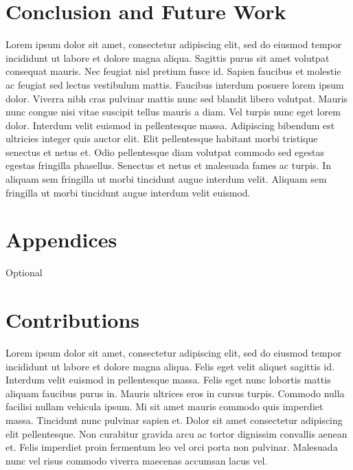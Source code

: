 \documentclass[conference]{IEEEtran}
\begin{document}
\section{Conclusion and Future Work}
Lorem ipsum dolor sit amet, consectetur adipiscing elit, sed do eiusmod tempor incididunt ut labore et dolore magna aliqua. Sagittis purus sit amet volutpat consequat mauris. Nec feugiat nisl pretium fusce id. Sapien faucibus et molestie ac feugiat sed lectus vestibulum mattis. Faucibus interdum posuere lorem ipsum dolor. Viverra nibh cras pulvinar mattis nunc sed blandit libero volutpat. Mauris nunc congue nisi vitae suscipit tellus mauris a diam. Vel turpis nunc eget lorem dolor. Interdum velit euismod in pellentesque massa. Adipiscing bibendum est ultricies integer quis auctor elit. Elit pellentesque habitant morbi tristique senectus et netus et. Odio pellentesque diam volutpat commodo sed egestas egestas fringilla phasellus. Senectus et netus et malesuada fames ac turpis. In aliquam sem fringilla ut morbi tincidunt augue interdum velit. Aliquam sem fringilla ut morbi tincidunt augue interdum velit euismod.

\section{Appendices}
Optional

\section{Contributions}
Lorem ipsum dolor sit amet, consectetur adipiscing elit, sed do eiusmod tempor incididunt ut labore et dolore magna aliqua. Felis eget velit aliquet sagittis id. Interdum velit euismod in pellentesque massa. Felis eget nunc lobortis mattis aliquam faucibus purus in. Mauris ultrices eros in cursus turpis. Commodo nulla facilisi nullam vehicula ipsum. Mi sit amet mauris commodo quis imperdiet massa. Tincidunt nunc pulvinar sapien et. Dolor sit amet consectetur adipiscing elit pellentesque. Non curabitur gravida arcu ac tortor dignissim convallis aenean et. Felis imperdiet proin fermentum leo vel orci porta non pulvinar. Malesuada nunc vel risus commodo viverra maecenas accumsan lacus vel.
\end{document}
